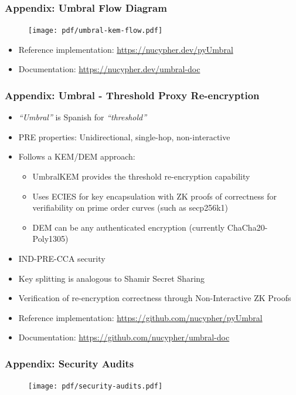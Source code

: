 \documentclass[xetex,mathsans,sans,aspectratio=169]{beamer}
\begin{document}
    \begin{frame}
      \frametitle{Appendix: Umbral Flow Diagram}
      \begin{figure}
        \centering
        \texttt{[image: pdf/umbral-kem-flow.pdf]}
      \end{figure}
      \begin{itemize}
           \item Reference implementation: \url{https://nucypher.dev/pyUmbral}
           \item Documentation: \url{https://nucypher.dev/umbral-doc}
      \end{itemize}
    \end{frame}

    \begin{frame}
        \frametitle{Appendix: Umbral - Threshold Proxy Re-encryption}
        \begin{itemize}
        	\item \emph{``Umbral''} is Spanish for \emph{``threshold''}
            \item PRE properties: Unidirectional, single-hop, non-interactive
            \item Follows a KEM/DEM approach:
            	\begin{itemize}
		    \item UmbralKEM provides the threshold re-encryption capability
                    \item Uses ECIES for key encapsulation with ZK proofs of correctness for verifiability on prime order curves (such as secp256k1)
            	    \item DEM can be any authenticated encryption (currently ChaCha20-Poly1305)
        	\end{itemize}
	    \item IND-PRE-CCA security
            \item Key splitting is analogous to Shamir Secret Sharing
	    \item Verification of re-encryption correctness through Non-Interactive ZK Proofs
            \item Reference implementation: \url{https://github.com/nucypher/pyUmbral}
	    \item Documentation: \url{https://github.com/nucypher/umbral-doc}
        \end{itemize}
    \end{frame}

    \begin{frame}
        \frametitle{Appendix: Security Audits}
        \begin{figure}
            \centering
            \texttt{[image: pdf/security-audits.pdf]}
      \end{figure}
    \end{frame}
\end{document}
